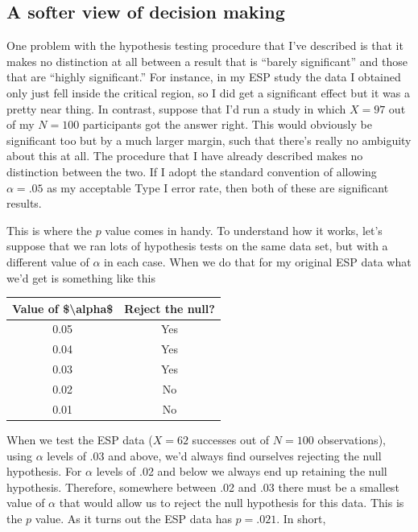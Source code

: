 \documentclass[
]{book}
\begin{document}
\hypertarget{a-softer-view-of-decision-making}{%
\subsection{A softer view of decision making}\label{a-softer-view-of-decision-making}}

One problem with the hypothesis testing procedure that I've described is that it makes no distinction at all between a result that is ``barely significant'' and those that are ``highly significant.'' For instance, in my ESP study the data I obtained only just fell inside the critical region, so I did get a significant effect but it was a pretty near thing. In contrast, suppose that I'd run a study in which \(X=97\) out of my \(N=100\) participants got the answer right. This would obviously be significant too but by a much larger margin, such that there's really no ambiguity about this at all. The procedure that I have already described makes no distinction between the two. If I adopt the standard convention of allowing \(\alpha = .05\) as my acceptable Type I error rate, then both of these are significant results.

This is where the \(p\) value comes in handy. To understand how it works, let's suppose that we ran lots of hypothesis tests on the same data set, but with a different value of \(\alpha\) in each case. When we do that for my original ESP data what we'd get is something like this

\begin{tabular}{c|c}
\hline
Value of \$\textbackslash{}alpha\$ & Reject the null?\\
\hline
0.05 & Yes\\
\hline
0.04 & Yes\\
\hline
0.03 & Yes\\
\hline
0.02 & No\\
\hline
0.01 & No\\
\hline
\end{tabular}

When we test the ESP data (\(X=62\) successes out of \(N=100\) observations), using \(\alpha\) levels of .03 and above, we'd always find ourselves rejecting the null hypothesis. For \(\alpha\) levels of .02 and below we always end up retaining the null hypothesis. Therefore, somewhere between .02 and .03 there must be a smallest value of \(\alpha\) that would allow us to reject the null hypothesis for this data. This is the \(p\) value. As it turns out the ESP data has \(p = .021\). In short,
\end{document}
